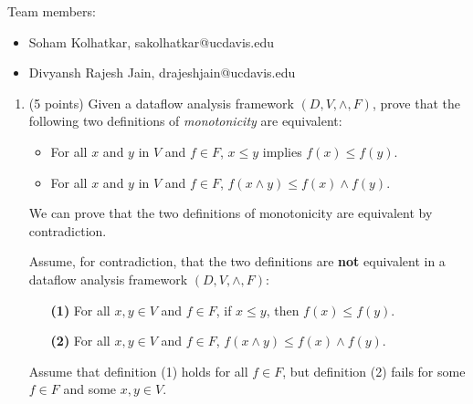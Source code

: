 \documentclass[12pt]{article}
\begin{document}
    \begin{mdframed}
      Team members:
      \begin{itemize}
        \item Soham Kolhatkar, sakolhatkar@ucdavis.edu %
        \item Divyansh Rajesh Jain, drajeshjain@ucdavis.edu %

      \end{itemize}
    \end{mdframed}

    \clearpage
    \begin{enumerate}


            
        \item (5 points) Given a dataflow analysis framework $(D, V, \wedge, F)$,
        prove that the following two definitions of \emph{monotonicity} are equivalent:
        \begin{itemize}
          \item For all $x$ and $y$ in $V$ and $f \in F$, $x \leq y$ implies $f(x) \leq f(y)$.
          \item For all $x$ and $y$ in $V$ and $f \in F$, $f(x \wedge y) \leq f(x) \wedge f(y)$.
        \end{itemize}

        \begin{mdframed}

           We can prove that the two definitions of monotonicity are equivalent by contradiction.
            
            Assume, for contradiction, that the two definitions are \textbf{not} equivalent in a dataflow analysis framework $(D, V, \wedge, F)$:
            
            \begin{itemize}
              \item[\textbf{(1)}] For all $x, y \in V$ and $f \in F$, if $x \leq y$, then $f(x) \leq f(y)$.
              \item[\textbf{(2)}] For all $x, y \in V$ and $f \in F$, $f(x \wedge y) \leq f(x) \wedge f(y)$.
            \end{itemize}
            
            Assume that definition (1) holds for all $f \in F$, but definition (2) fails for some $f \in F$ and some $x, y \in V$.
            

\end{mdframed}
\end{enumerate}
\end{document}
